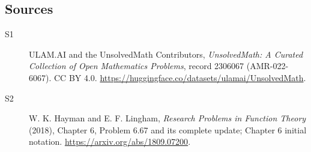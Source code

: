 \documentclass[11pt]{article}
\begin{document}
\subsection{Sources}
\begin{description}
\item[\hypertarget{source:2306067:1}{S1}] ULAM.AI and the UnsolvedMath Contributors, \emph{UnsolvedMath: A Curated Collection of Open Mathematics Problems}, record 2306067 (AMR-022-6067). CC BY 4.0. \url{https://huggingface.co/datasets/ulamai/UnsolvedMath}.
\item[\hypertarget{source:2306067:2}{S2}] W. K. Hayman and E. F. Lingham, \emph{Research Problems in Function Theory} (2018), Chapter 6, Problem 6.67 and its complete update; Chapter 6 initial notation. \url{https://arxiv.org/abs/1809.07200}.
\end{description}
\label{end:2306067}
\end{document}
